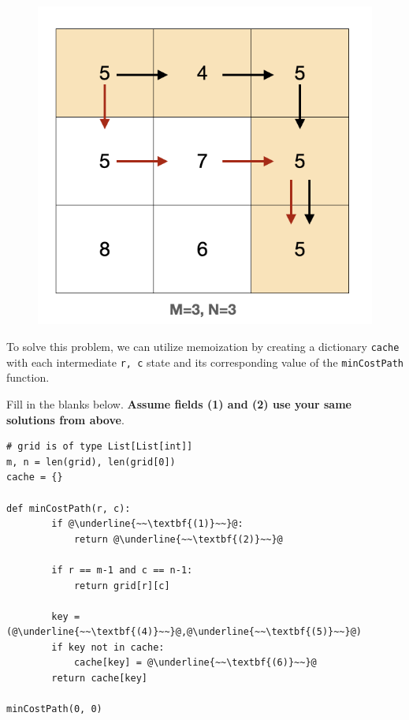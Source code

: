 \documentclass[11pt,addpoints,answers]{exam}
\begin{document}
\begin{questions}
\begin{parts}
\begin{subparts}
\begin{figure}[ht]
\centering
\includegraphics[scale=0.37]{fig/grid_memoize.png}
\caption{}
\label{fig:grid_memoize}
\end{figure}


To solve this problem, we can utilize memoization by creating a dictionary \texttt{cache} with each intermediate \texttt{r, c} state and its corresponding value of the \texttt{minCostPath} function.

Fill in the blanks below. \textbf{Assume fields (1) and (2) use your same solutions from above}.

\begin{lstlisting}[escapechar=@]
# grid is of type List[List[int]]
m, n = len(grid), len(grid[0])
cache = {}
        
def minCostPath(r, c):
        if @\underline{~~\textbf{(1)}~~}@:
            return @\underline{~~\textbf{(2)}~~}@

        if r == m-1 and c == n-1:
            return grid[r][c]

        key = (@\underline{~~\textbf{(4)}~~}@,@\underline{~~\textbf{(5)}~~}@)
        if key not in cache:
            cache[key] = @\underline{~~\textbf{(6)}~~}@
        return cache[key]

minCostPath(0, 0)
\end{lstlisting}
\vspace{-1em} %


\end{subparts}
\end{parts}
\end{questions}
\end{document}
